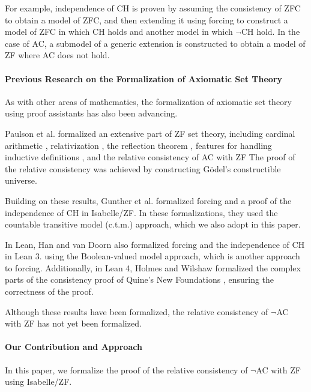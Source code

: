 \documentclass{report}
\begin{document}
For example, independence of CH is proven by assuming the consistency of ZFC to obtain a model of ZFC, 
and then extending it using forcing to construct a model of ZFC in which CH holds 
and another model in which $\neg$CH hold.
In the case of AC, a submodel of a generic extension is constructed to obtain a model of ZF where AC does not hold.

\paragraph{Previous Research on the Formalization of Axiomatic Set Theory}

As with other areas of mathematics, the formalization of axiomatic set theory using proof assistants has also been advancing.

Paulson et al. formalized an extensive part of ZF set theory,
including cardinal arithmetic \cite{paulson_cardinal_AC}, relativization \cite{paulson_AC_consistency}, the reflection theorem \cite{paulson_reflection}, 
features for handling inductive definitions \cite{paulson_datatype_impl}, and the relative consistency of AC with ZF \cite{paulson_AC_consistency}
The proof of the relative consistency was achieved by constructing Gödel's constructible universe.

Building on these results, Gunther et al. formalized forcing and a proof of the independence of CH \cite{gunther_forcing,gunther_independence} in Isabelle/ZF.
In these formalizations, they used the countable transitive model (c.t.m.) approach, 
which we also adopt in this paper.

In Lean, Han and van Doorn also formalized forcing and the independence of CH \cite{flypitch} in Lean 3.
using the Boolean-valued model approach, which is another approach to forcing.
Additionally, in Lean 4, Holmes and Wilshaw formalized the complex parts of the consistency proof of Quine's New Foundations \cite{NF_consistency}, ensuring the correctness of the proof.

Although these results have been formalized, 
the relative consistency of $\neg$AC with ZF has not yet been formalized. 

\paragraph{Our Contribution and Approach}

In this paper, we formalize the proof of the relative consistency of $\neg$AC with ZF using Isabelle/ZF.
\end{document}
